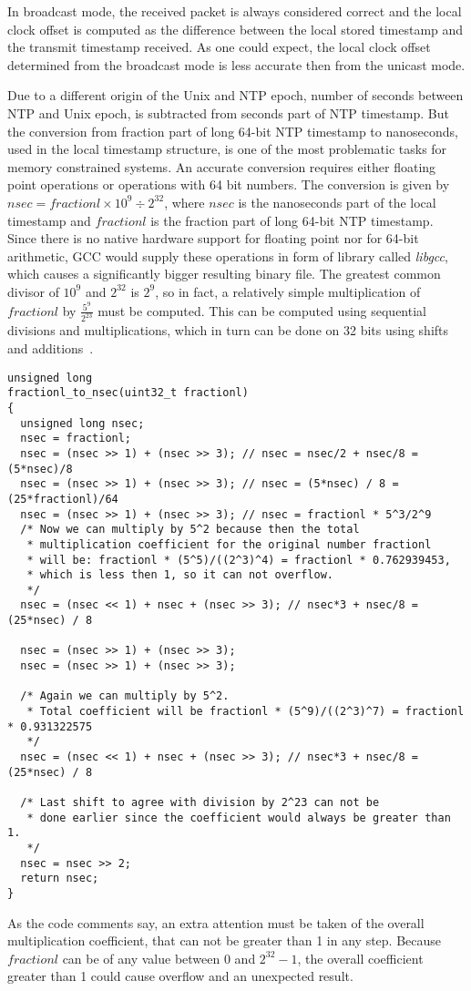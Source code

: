 In broadcast mode, the received packet is always considered correct
and the local clock offset is computed as the difference between the local stored timestamp
and the transmit timestamp received.
As one could expect, the local clock offset determined from the broadcast mode
is less accurate then from the unicast mode.

Due to a different origin of the Unix and NTP epoch,
number of seconds between NTP and Unix epoch,
is subtracted from seconds part of NTP timestamp.
But the conversion from fraction part of long 64-bit NTP timestamp to nanoseconds,
used in the local timestamp structure,
is one of the most problematic tasks for memory constrained systems.
An accurate conversion requires either floating point operations or operations with 64 bit numbers.
The conversion is given by
$nsec = fractionl \times 10^9 \div 2^{32}$, where $nsec$ is the nanoseconds part of the local timestamp
and $fractionl$ is the fraction part of long 64-bit NTP timestamp.
Since there is no native hardware support for floating point nor for 64-bit arithmetic,
GCC would supply these operations in form of library called {\it{libgcc}},
which causes a significantly bigger resulting binary file.
The greatest common divisor of $10^9$ and $2^{32}$ is $2^9$,
so in fact, a relatively simple multiplication of $fractionl$ by $\frac{5^9}{2^{23}}$ must be computed.
This can be computed using sequential divisions and multiplications,
which in turn can be done on 32 bits using shifts and additions~\cite{c99}.
\begin{lstlisting}[caption=Conversion from NTP fraction part to nanoseconds]
unsigned long
fractionl_to_nsec(uint32_t fractionl)
{
  unsigned long nsec;
  nsec = fractionl;
  nsec = (nsec >> 1) + (nsec >> 3); // nsec = nsec/2 + nsec/8 = (5*nsec)/8
  nsec = (nsec >> 1) + (nsec >> 3); // nsec = (5*nsec) / 8 = (25*fractionl)/64
  nsec = (nsec >> 1) + (nsec >> 3); // nsec = fractionl * 5^3/2^9
  /* Now we can multiply by 5^2 because then the total
   * multiplication coefficient for the original number fractionl
   * will be: fractionl * (5^5)/((2^3)^4) = fractionl * 0.762939453,
   * which is less then 1, so it can not overflow.
   */
  nsec = (nsec << 1) + nsec + (nsec >> 3); // nsec*3 + nsec/8 = (25*nsec) / 8

  nsec = (nsec >> 1) + (nsec >> 3);
  nsec = (nsec >> 1) + (nsec >> 3);

  /* Again we can multiply by 5^2.
   * Total coefficient will be fractionl * (5^9)/((2^3)^7) = fractionl * 0.931322575
   */
  nsec = (nsec << 1) + nsec + (nsec >> 3); // nsec*3 + nsec/8 = (25*nsec) / 8

  /* Last shift to agree with division by 2^23 can not be
   * done earlier since the coefficient would always be greater than 1.
   */
  nsec = nsec >> 2;
  return nsec;
}
\end{lstlisting}
As the code comments say, an extra attention must be taken of the overall
multiplication coefficient,
that can not be greater than 1 in any step.
Because $fractionl$ can be of any value between $0$ and $2^{32}-1$,
the overall coefficient greater than 1 could cause overflow and an unexpected result.

